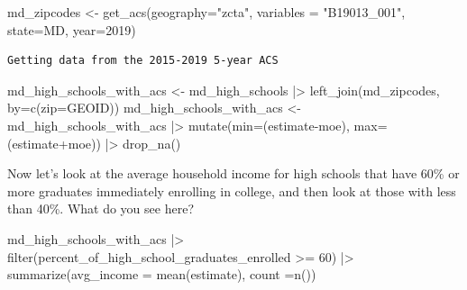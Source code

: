 \documentclass[
  letterpaper,
  DIV=11,
  numbers=noendperiod]{scrreprt}
\newenvironment{Shaded}{\begin{snugshade}}{\end{snugshade}}
\newcommand{\AttributeTok}[1]{\textcolor[rgb]{0.40,0.45,0.13}{#1}}
\newcommand{\DecValTok}[1]{\textcolor[rgb]{0.68,0.00,0.00}{#1}}
\newcommand{\FunctionTok}[1]{\textcolor[rgb]{0.28,0.35,0.67}{#1}}
\newcommand{\NormalTok}[1]{\textcolor[rgb]{0.00,0.23,0.31}{#1}}
\newcommand{\OtherTok}[1]{\textcolor[rgb]{0.00,0.23,0.31}{#1}}
\newcommand{\SpecialCharTok}[1]{\textcolor[rgb]{0.37,0.37,0.37}{#1}}
\newcommand{\StringTok}[1]{\textcolor[rgb]{0.13,0.47,0.30}{#1}}
\begin{document}
\begin{Shaded}
\begin{Highlighting}[]
\NormalTok{md\_zipcodes }\OtherTok{\textless{}{-}} \FunctionTok{get\_acs}\NormalTok{(}\AttributeTok{geography=}\StringTok{"zcta"}\NormalTok{, }\AttributeTok{variables =} \StringTok{"B19013\_001"}\NormalTok{, }\AttributeTok{state=}\StringTok{\textquotesingle{}MD\textquotesingle{}}\NormalTok{, }\AttributeTok{year=}\DecValTok{2019}\NormalTok{)}
\end{Highlighting}
\end{Shaded}

\begin{verbatim}
Getting data from the 2015-2019 5-year ACS
\end{verbatim}

\begin{Shaded}
\begin{Highlighting}[]
\NormalTok{md\_high\_schools\_with\_acs }\OtherTok{\textless{}{-}}\NormalTok{ md\_high\_schools }\SpecialCharTok{|\textgreater{}} \FunctionTok{left\_join}\NormalTok{(md\_zipcodes, }\AttributeTok{by=}\FunctionTok{c}\NormalTok{(}\StringTok{\textquotesingle{}zip\textquotesingle{}}\OtherTok{=}\StringTok{\textquotesingle{}GEOID\textquotesingle{}}\NormalTok{))}
\NormalTok{md\_high\_schools\_with\_acs }\OtherTok{\textless{}{-}}\NormalTok{ md\_high\_schools\_with\_acs }\SpecialCharTok{|\textgreater{}} \FunctionTok{mutate}\NormalTok{(}\AttributeTok{min=}\NormalTok{(estimate}\SpecialCharTok{{-}}\NormalTok{moe), }\AttributeTok{max=}\NormalTok{(estimate}\SpecialCharTok{+}\NormalTok{moe)) }\SpecialCharTok{|\textgreater{}} \FunctionTok{drop\_na}\NormalTok{()}
\end{Highlighting}
\end{Shaded}

Now let's look at the average household income for high schools that
have 60\% or more graduates immediately enrolling in college, and then
look at those with less than 40\%. What do you see here?

\begin{Shaded}
\begin{Highlighting}[]
\NormalTok{md\_high\_schools\_with\_acs }\SpecialCharTok{|\textgreater{}}
  \FunctionTok{filter}\NormalTok{(percent\_of\_high\_school\_graduates\_enrolled }\SpecialCharTok{\textgreater{}=} \DecValTok{60}\NormalTok{) }\SpecialCharTok{|\textgreater{}} 
  \FunctionTok{summarize}\NormalTok{(}\AttributeTok{avg\_income =} \FunctionTok{mean}\NormalTok{(estimate), }\AttributeTok{count =}\FunctionTok{n}\NormalTok{())}
\end{Highlighting}
\end{Shaded}
\end{document}
